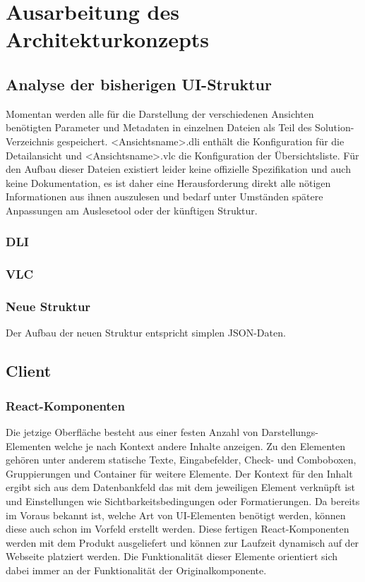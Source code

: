 \chapter{Ausarbeitung des Architekturkonzepts}\label{chap:concept}
\section{Analyse der bisherigen UI-Struktur}
Momentan werden alle für die Darstellung der verschiedenen Ansichten benötigten Parameter und Metadaten in einzelnen Dateien als Teil des Solution-Verzeichnis gespeichert. <Ansichtsname>.dli enthält die Konfiguration für die Detailansicht und <Ansichtsname>.vlc die Konfiguration der Übersichtsliste. Für den Aufbau dieser Dateien existiert leider keine offizielle Spezifikation und auch keine Dokumentation, es ist daher eine Herausforderung direkt alle nötigen Informationen aus ihnen auszulesen und bedarf unter Umständen spätere Anpassungen am Auslesetool oder der künftigen Struktur.

\subsection{DLI}
\subsection{VLC}
\subsection{Neue Struktur}
Der Aufbau der neuen Struktur entspricht simplen JSON-Daten. 

\section{Client}

\subsection{React-Komponenten}
Die jetzige Oberfläche besteht aus einer festen Anzahl von Darstellungs-Elementen welche je nach Kontext andere Inhalte anzeigen. Zu den Elementen gehören unter anderem statische Texte, Eingabefelder, Check- und Comboboxen, Gruppierungen und Container für weitere Elemente. Der Kontext für den Inhalt ergibt sich aus dem Datenbankfeld das mit dem jeweiligen Element verknüpft ist und Einstellungen wie Sichtbarkeitsbedingungen oder Formatierungen. Da bereits im Voraus bekannt ist, welche Art von UI-Elementen benötigt werden, können diese auch schon im Vorfeld erstellt werden. Diese fertigen React-Komponenten werden mit dem Produkt ausgeliefert und können zur Laufzeit dynamisch auf der Webseite platziert werden. Die Funktionalität dieser Elemente orientiert sich dabei immer an der Funktionalität der Originalkomponente.

